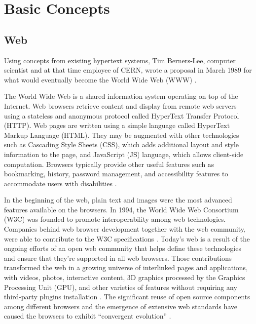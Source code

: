 \chapter{Basic Concepts} %
\label{cha:basic_concepts}
%
%
\section{Web} %
\label{sec:basic_concepts:web}

Using concepts from existing hypertext systems, Tim Berners-Lee, computer scientist and at that time employee of CERN, wrote a proposal in March 1989 for what would eventually become the World Wide Web (WWW) \cite{WC2006}.

The World Wide Web is a shared information system operating on top of the Internet. Web browsers retrieve content and display from remote web servers using a stateless and anonymous protocol called HyperText Transfer Protocol (HTTP). Web pages are written using a simple language called HyperText Markup Language (HTML). They may be augmented with other technologies such as Cascading Style Sheets (CSS), which adds additional layout and style information to the page, and JavaScript (JS) language, which allows client-side computation. Browsers typically provide other useful features such as bookmarking, history, password management, and accessibility features to accommodate users with disabilities \cite{Grosskurth2005}.

In the beginning of the web, plain text and images were the most advanced features available on the browsers. In 1994, the World Wide Web Consortium (W3C) was founded to promote interoperability among web technologies. Companies behind web browser development together with the web community, were able to contribute to the W3C specifications \cite{WC2006}. Today's web is a result of the ongoing efforts of an open web community that helps define these technologies and ensure that they're supported in all web browsers. Those contributions transformed the web in a growing universe of interlinked pages and applications, with videos, photos, interactive content, 3D graphics processed by the Graphics Processing Unit (GPU), and other varieties of features without requiring any third-party plugins installation \cite{Hickson2013}. The significant reuse of open source components among different browsers and the emergence of extensive web standards have caused the browsers to exhibit ``convergent evolution'' \cite{Grosskurth2005}.

